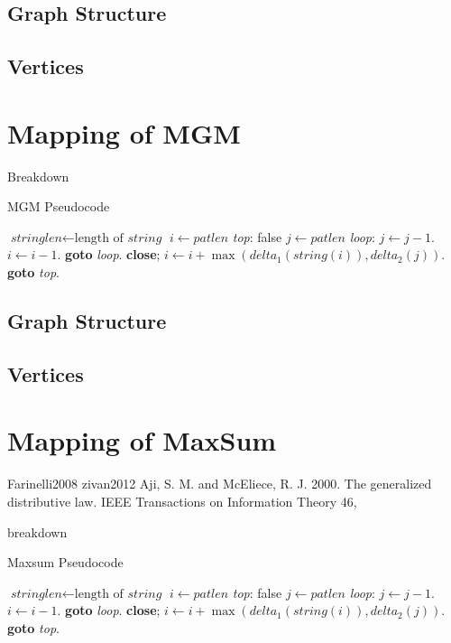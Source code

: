 \subsection{Graph Structure}
\subsection{Vertices}

\section{Mapping of MGM}

Breakdown

    \begin{algorithm}
\caption{MGM Pseudocode}\label{euclid}
\begin{algorithmic}[2]
\State $\textit{stringlen} \gets \text{length of }\textit{string}$
\State $i \gets \textit{patlen}$
\BState \emph{top}:
 \Return false
\EndIf
\State $j \gets \textit{patlen}$
\BState \emph{loop}:
\State $j \gets j-1$.
\State $i \gets i-1$.
\State \textbf{goto} \emph{loop}.
\State \textbf{close};
\EndIf
\State $i \gets i+\max(\textit{delta}_1(\textit{string}(i)),\textit{delta}_2(j))$.
\State \textbf{goto} \emph{top}.
\EndProcedure
\end{algorithmic}
\end{algorithm}

\subsection{Graph Structure}
\subsection{Vertices}

\section{Mapping of MaxSum}

\cite{Yedidsion}
Farinelli2008
zivan2012
Aji, S. M. and McEliece, R. J. 2000. The generalized distributive law. IEEE Transactions on Information Theory 46,
    
breakdown

    \begin{algorithm}
\caption{Maxsum Pseudocode}\label{euclid}
\begin{algorithmic}[3]
\State $\textit{stringlen} \gets \text{length of }\textit{string}$
\State $i \gets \textit{patlen}$
\BState \emph{top}:
 \Return false
\EndIf
\State $j \gets \textit{patlen}$
\BState \emph{loop}:
\State $j \gets j-1$.
\State $i \gets i-1$.
\State \textbf{goto} \emph{loop}.
\State \textbf{close};
\EndIf
\State $i \gets i+\max(\textit{delta}_1(\textit{string}(i)),\textit{delta}_2(j))$.
\State \textbf{goto} \emph{top}.
\EndProcedure
\end{algorithmic}
\end{algorithm}

